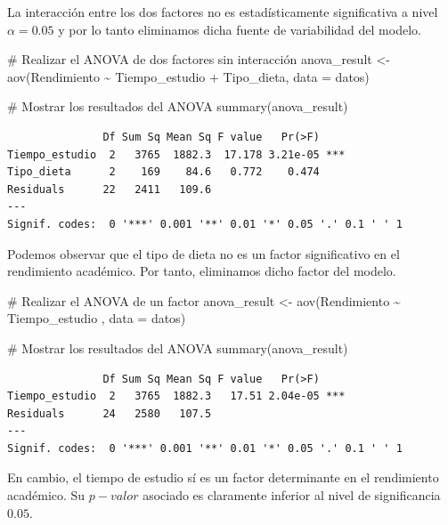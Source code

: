 \documentclass[
  letterpaper,
  DIV=11,
  numbers=noendperiod]{scrreprt}
\newenvironment{Shaded}{\begin{snugshade}}{\end{snugshade}}
\newcommand{\AttributeTok}[1]{\textcolor[rgb]{0.40,0.45,0.13}{#1}}
\newcommand{\CommentTok}[1]{\textcolor[rgb]{0.37,0.37,0.37}{#1}}
\newcommand{\FunctionTok}[1]{\textcolor[rgb]{0.28,0.35,0.67}{#1}}
\newcommand{\NormalTok}[1]{\textcolor[rgb]{0.00,0.23,0.31}{#1}}
\newcommand{\OtherTok}[1]{\textcolor[rgb]{0.00,0.23,0.31}{#1}}
\newcommand{\SpecialCharTok}[1]{\textcolor[rgb]{0.37,0.37,0.37}{#1}}
\begin{document}
\begin{tcolorbox}
La interacción entre los dos factores no es estadísticamente
significativa a nivel \(\alpha=0.05\) y por lo tanto eliminamos dicha
fuente de variabilidad del modelo.

\begin{Shaded}
\begin{Highlighting}[]
\CommentTok{\# Realizar el ANOVA de dos factores sin interacción}
\NormalTok{anova\_result }\OtherTok{\textless{}{-}} \FunctionTok{aov}\NormalTok{(Rendimiento }\SpecialCharTok{\textasciitilde{}}\NormalTok{ Tiempo\_estudio }\SpecialCharTok{+}\NormalTok{ Tipo\_dieta, }\AttributeTok{data =}\NormalTok{ datos)}

\CommentTok{\# Mostrar los resultados del ANOVA}
\FunctionTok{summary}\NormalTok{(anova\_result)}
\end{Highlighting}
\end{Shaded}

\begin{verbatim}
               Df Sum Sq Mean Sq F value   Pr(>F)    
Tiempo_estudio  2   3765  1882.3  17.178 3.21e-05 ***
Tipo_dieta      2    169    84.6   0.772    0.474    
Residuals      22   2411   109.6                     
---
Signif. codes:  0 '***' 0.001 '**' 0.01 '*' 0.05 '.' 0.1 ' ' 1
\end{verbatim}

Podemos observar que el tipo de dieta no es un factor significativo en
el rendimiento académico. Por tanto, eliminamos dicho factor del modelo.

\begin{Shaded}
\begin{Highlighting}[]
\CommentTok{\# Realizar el ANOVA de un factor}
\NormalTok{anova\_result }\OtherTok{\textless{}{-}} \FunctionTok{aov}\NormalTok{(Rendimiento }\SpecialCharTok{\textasciitilde{}}\NormalTok{ Tiempo\_estudio , }\AttributeTok{data =}\NormalTok{ datos)}

\CommentTok{\# Mostrar los resultados del ANOVA}
\FunctionTok{summary}\NormalTok{(anova\_result)}
\end{Highlighting}
\end{Shaded}

\begin{verbatim}
               Df Sum Sq Mean Sq F value   Pr(>F)    
Tiempo_estudio  2   3765  1882.3   17.51 2.04e-05 ***
Residuals      24   2580   107.5                     
---
Signif. codes:  0 '***' 0.001 '**' 0.01 '*' 0.05 '.' 0.1 ' ' 1
\end{verbatim}

En cambio, el tiempo de estudio sí es un factor determinante en el
rendimiento académico. Su \(p-valor\) asociado es claramente inferior al
nivel de significancia \(0.05\).


\end{tcolorbox}
\end{document}
